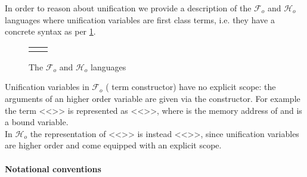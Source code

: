 \documentclass[sigconf,natbib=false,review]{acmart}
\newcommand{\Fo}{\ensuremath{\mathcal{F}_{\!o}\xspace}} %
\newcommand{\Ho}{\ensuremath{\mathcal{H}_o}\xspace}
\begin{document}
In order to reason about unification we provide a description of the
\Fo{} and \Ho languages where unification variables
are first class terms, i.e. they have a concrete syntax as
per \cref{code:common-terms}.
%
{
\setlength{\abovecaptionskip}{0pt}
\setlength{\belowcaptionskip}{-13pt}
\begin{figure}[b] %
  \begin{tabular}{ll}
  \begin{minipage}{0.21\textwidth}
   {code/fo_tm}
  \end{minipage}
  &
  \begin{minipage}{0.24\textwidth}
   {code/ho_tm}
  \end{minipage}
  \end{tabular}\vspace{4pt}
  \caption{The \Fo{} and \Ho languages}\vspace{0.3em}
  \label{code:common-terms}
\end{figure}
}
Unification variables
in \Fo{} ( term constructor) have no explicit scope:
the arguments of an higher order variable are given via the 
constructor. For example the term <<>> is represented as
<<>>, where  is the memory address
of  and  is a bound variable.\\
In \Ho the representation of <<>> is instead <<>>,
since unification variables are higher order and come equipped with an
explicit scope.
%

\paragraph{Notational conventions}
\end{document}
